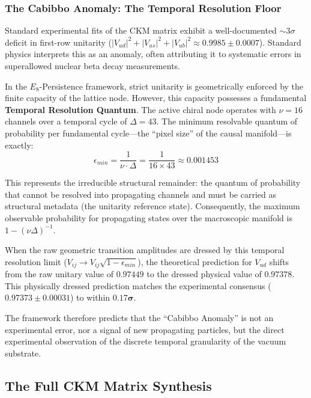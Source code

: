 \subsubsection{The Cabibbo Anomaly: The Temporal Resolution Floor}
Standard experimental fits of the CKM matrix exhibit a well-documented $\sim 3\sigma$ deficit in first-row unitarity ($|V_{ud}|^2 + |V_{us}|^2 + |V_{ub}|^2 \approx 0.9985 \pm 0.0007$). Standard physics interprets this as an anomaly, often attributing it to systematic errors in superallowed nuclear beta decay measurements.

In the $E_8$-Persistence framework, strict unitarity is geometrically enforced by the finite capacity of the lattice node. However, this capacity possesses a fundamental \textbf{Temporal Resolution Quantum}. The active chiral node operates with $\nu = 16$ channels over a temporal cycle of $\Delta = 43$. The minimum resolvable quantum of probability per fundamental cycle---the ``pixel size'' of the causal manifold---is exactly:
\begin{equation}
    \epsilon_{min} = \frac{1}{\nu \cdot \Delta} = \frac{1}{16 \times 43} \approx 0.001453
\end{equation}

This represents the irreducible structural remainder: the quantum of probability that cannot be resolved into propagating channels and must be carried as structural metadata (the unitarity reference state). Consequently, the maximum observable probability for propagating states over the macroscopic manifold is $1 - (\nu\Delta)^{-1}$. 

When the raw geometric transition amplitudes are dressed by this temporal resolution limit ($V_{ij} \to V_{ij} \sqrt{1 - \epsilon_{min}}$), the theoretical prediction for $V_{ud}$ shifts from the raw unitary value of $0.97449$ to the dressed physical value of $\mathbf{0.97378}$. This physically dressed prediction matches the experimental consensus ($0.97373 \pm 0.00031$) to within $\mathbf{0.17\sigma}$.

The framework therefore predicts that the ``Cabibbo Anomaly'' is not an experimental error, nor a signal of new propagating particles, but the direct experimental observation of the discrete temporal granularity of the vacuum substrate.




\subsection{The Full CKM Matrix Synthesis}

